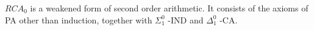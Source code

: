 \documentclass[12pt]{article}
\begin{document}
$RCA_0$ is a weakened form of second order arithmetic.  It consists of the axioms of PA other than induction, together with $\Sigma^0_1$ -IND and $\Delta^0_1$ -CA.
\end{document}
